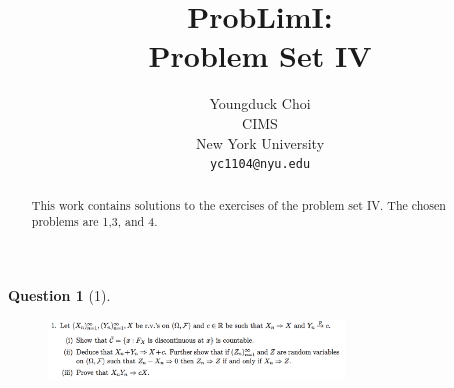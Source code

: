 \documentclass{article} %
\title{ProbLimI: \\
Problem Set IV}
\author{
Youngduck Choi \\
CIMS \\
New York University\\
\texttt{yc1104@nyu.edu} \\
}
\theoremstyle{quest}
\newtheorem*{question}{Question}
\begin{document}
\maketitle

\begin{abstract}
This work contains solutions to the exercises of the problem set IV. The
chosen problems are 1,3, and 4.
\end{abstract}

\bigskip

\begin{question}[1]
\hfill
\begin{figure}[h!]
  \centering
    \includegraphics[width=0.7\textwidth]{problim-e4-p1.png}
\end{figure}
\end{question}
\end{document}
